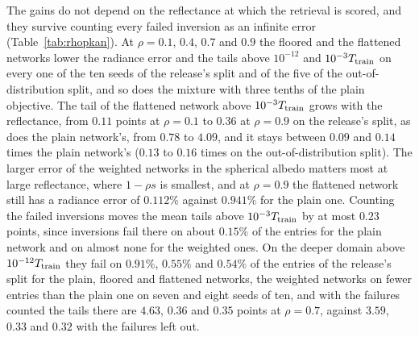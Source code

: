 \documentclass[11pt]{article}
\theoremstyle{remark}
\newcommand{\1}{\mathbf{1}}
\begin{document}
The gains do not depend on the reflectance at which the retrieval is scored, and they survive counting every failed
inversion as an infinite error (Table~\ref{tab:rhopkan}). At $\rho=0.1$, $0.4$, $0.7$ and $0.9$ the floored and the
flattened networks lower the radiance error and the tails above $10^{-12}$ and $10^{-3}T_{\rm train}$ on every one of the
ten seeds of the release's split and of the five of the out-of-distribution split, and so does the mixture with three
tenths of the plain objective. The tail of the flattened network above $10^{-3}T_{\rm train}$ grows with the reflectance,
from $0.11$ points at $\rho=0.1$ to $0.36$ at $\rho=0.9$ on the release's split, as does the plain network's, from
$0.78$ to $4.09$, and it stays between $0.09$ and $0.14$ times the plain network's ($0.13$ to $0.16$ times on the
out-of-distribution split). The larger error of the weighted networks in the spherical albedo matters most at large
reflectance, where $1-\rho s$ is smallest, and at $\rho=0.9$ the flattened network still has a radiance error of
$0.112\%$ against $0.941\%$ for the plain one. Counting the failed inversions moves the mean tails above
$10^{-3}T_{\rm train}$ by at most $0.23$ points, since inversions fail there on about $0.15\%$ of the entries for the
plain network and on almost none for the weighted ones. On the deeper domain above $10^{-12}T_{\rm train}$ they
fail on $0.91\%$, $0.55\%$ and $0.54\%$ of the entries of the release's split for the plain, floored and flattened
networks, the weighted networks on fewer entries than the plain one on seven and eight seeds of ten, and with the
failures counted the tails there are $4.63$, $0.36$ and $0.35$ points at $\rho=0.7$, against $3.59$, $0.33$ and $0.32$
with the failures left out.

\begin{table}[t]
\centering\footnotesize\setlength{\tabcolsep}{3pt}
\resizebox{\textwidth}{!}{}
\caption{Ablations on the release's split, three seeds each: the exponent $\kappa$ and the floor $u$ of the flattened
weights, the albedo left unweighted, the share of the plain objective in the mixture, and, in the last block, a wider
network of six hidden layers of $1{,}024$ units trained for $400$ epochs. The scores are those of Table~\ref{tab:pkan};
the sixth column is the RMSE of the spherical albedo $S$. Mean $\pm$ standard deviation over the seeds.}\label{tab:pkanabl}
\end{table}
\end{document}
